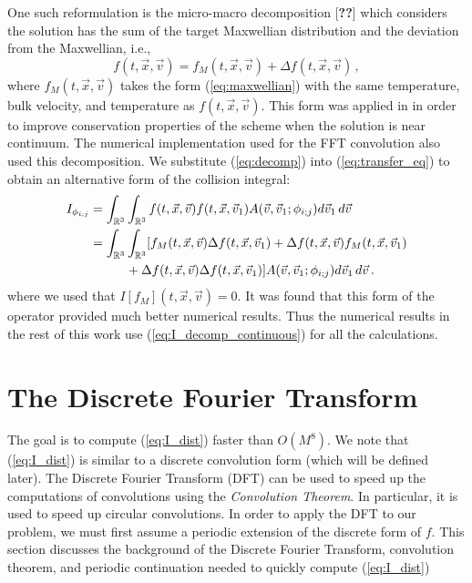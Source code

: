 \documentclass[12pt]{CSUNthesis}
\def\R{\mathbb{R}}
\def\R{\mathbb{R}}
\newcommand{\vecx}{\vec{x}}
\newcommand{\vecv}{\vec{v}}
\begin{document}
One such reformulation is the micro-macro decomposition [{\bf ??}] which considers the solution has the sum of the target Maxwellian distribution and the deviation from the Maxwellian, i.e.,
\begin{equation}
\label{eq:decomp}
f(t,\vecx,\vecv) = f_M(t, \vecx, \vecv) + \Delta f(t,\vecx,\vecv)\, ,
\end{equation}
where $f_M(t,\vecx,\vecv)$ takes the form (\ref{eq:maxwellian}) with the same temperature, bulk velocity, and temperature as $f(t,\vecx,\vecv)$. This form was applied in \cite{AlekseenkoJosyula2012} in order to improve conservation properties of the scheme when the solution is near continuum. The numerical implementation used for the FFT convolution also used this decomposition. We substitute (\ref{eq:decomp}) into (\ref{eq:transfer_eq}) to obtain an alternative form of the collision integral:
\begin{align}
\label{eq:I_decomp_continuous}
I_{\phi_{i;j}}&= \int_{\R^3}\int_{\R^3} f(t,\vec{x},\vec{v}) f(t,\vec{x},\vec{v}_{1})
 A(\vec{v},\vec{v}_{1};\phi_{i;j})   d\vec{v}_{1}\, d\vec{v}\, \nonumber \\
 &=\int_{\R^3}\int_{\R^3} [f_{M}(t,\vec{x},\vec{v}) \Delta f(t,\vec{x},\vec{v}_{1})
 +\Delta f(t,\vec{x},\vec{v}) f_{M}(t,\vec{x},\vec{v}_{1})\nonumber \\
 &\hspace*{10mm}{}+ \Delta f(t,\vec{x},\vec{v}) \Delta f(t,\vec{x},\vec{v}_{1})]
 A(\vec{v},\vec{v}_{1};\phi_{i;j})   d\vec{v}_{1}\, d\vec{v}\, . 
\end{align}
where we used that $I[f_M](t,\vecx,\vecv)=0$. It was found that this form of the operator provided much better numerical results. Thus the numerical results in the rest of this work use (\ref{eq:I_decomp_continuous}) for all the calculations. 


\chapter{The Discrete Fourier Transform}
\label{chap:dft}
The goal is to compute (\ref{eq:I_dist}) faster than $O(M^8)$. We note that (\ref{eq:I_dist}) is similar to a discrete convolution form (which will be defined later). The Discrete Fourier Transform (DFT) can be used to speed up the computations of convolutions using the \textit{Convolution Theorem}. In particular, it is used to speed up circular convolutions. In order to apply the DFT to our problem, we must first assume a periodic extension of the discrete form of $f$. This section discusses the background of the Discrete Fourier Transform, convolution theorem, and periodic continuation needed to quickly compute (\ref{eq:I_dist}) 
\end{document}

